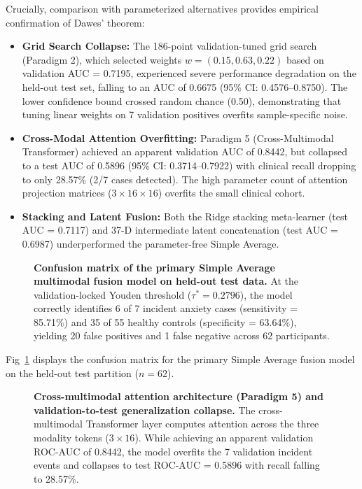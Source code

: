 \documentclass[10pt,letterpaper]{article}
\begin{document}
Crucially, comparison with parameterized alternatives provides empirical confirmation of Dawes' theorem:
\begin{itemize}
    \item \textbf{Grid Search Collapse:} The 186-point validation-tuned grid search (Paradigm 2), which selected weights $w = (0.15, 0.63, 0.22)$ based on validation AUC = 0.7195, experienced severe performance degradation on the held-out test set, falling to an AUC of 0.6675 (95\% CI: 0.4576--0.8750). The lower confidence bound crossed random chance (0.50), demonstrating that tuning linear weights on 7 validation positives overfits sample-specific noise.
    \item \textbf{Cross-Modal Attention Overfitting:} Paradigm 5 (Cross-Multimodal Transformer) achieved an apparent validation AUC of 0.8442, but collapsed to a test AUC of 0.5896 (95\% CI: 0.3714--0.7922) with clinical recall dropping to only 28.57\% (2/7 cases detected). The high parameter count of attention projection matrices ($3 \times 16 \times 16$) overfits the small clinical cohort.
    \item \textbf{Stacking and Latent Fusion:} Both the Ridge stacking meta-learner (test AUC = 0.7117) and 37-D intermediate latent concatenation (test AUC = 0.6987) underperformed the parameter-free Simple Average.
\end{itemize}

\begin{figure}[!h]
\caption{\textbf{Confusion matrix of the primary Simple Average multimodal fusion model on held-out test data.}
At the validation-locked Youden threshold ($\tau^* = 0.2796$), the model correctly identifies 6 of 7 incident anxiety cases (sensitivity = 85.71\%) and 35 of 55 healthy controls (specificity = 63.64\%), yielding 20 false positives and 1 false negative across 62 participants.}
\label{fig:confusion_matrix}
\end{figure}

Fig~\ref{fig:confusion_matrix} displays the confusion matrix for the primary Simple Average fusion model on the held-out test partition ($n=62$).
        \begin{figure}[!h]
        \caption{\textbf{Cross-multimodal attention architecture (Paradigm 5) and validation-to-test generalization collapse.}
        The cross-multimodal Transformer layer computes attention across the three modality tokens ($3 \times 16$). While achieving an apparent validation ROC-AUC of 0.8442, the model overfits the 7 validation incident events and collapses to test ROC-AUC = 0.5896 with recall falling to 28.57\%.}
        \label{fig:cross_modal_attention}
        \end{figure}
\end{document}
